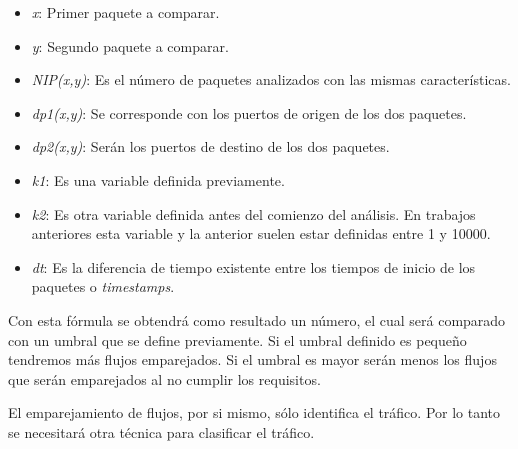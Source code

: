 \begin{itemize}
\item \textit{x}: Primer paquete a comparar.
\item \textit{y}: Segundo paquete a comparar.
\item \textit{NIP(x,y)}: Es el número de paquetes analizados con las mismas características.
\item \textit{dp1(x,y)}: Se corresponde con los puertos de origen de los dos paquetes.
\item \textit{dp2(x,y)}: Serán los puertos de destino de los dos paquetes.
\item \textit{k1}: Es una variable definida previamente.
\item \textit{k2}: Es otra variable definida antes del comienzo del análisis. En trabajos anteriores esta variable 
y la anterior suelen estar definidas entre 1 y 10000.
\item \textit{dt}: Es la diferencia de tiempo existente entre los tiempos de inicio de los 
paquetes o \textit{timestamps}.
\end{itemize}

\intro Con esta fórmula se obtendrá como resultado un número, el cual será comparado con un umbral que se 
define previamente. Si el umbral definido es pequeño tendremos más flujos emparejados. Si el umbral es mayor 
serán menos los flujos que serán emparejados al no cumplir los requisitos.

\intro El emparejamiento de flujos, por si mismo, sólo identifica el tráfico. Por lo tanto se 
necesitará otra técnica para clasificar el tráfico.
